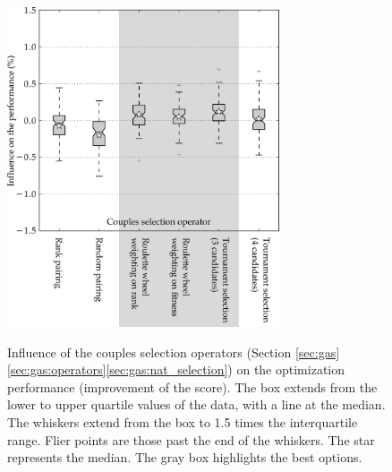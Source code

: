 \documentclass{ametsoc}
\begin{document}
\begin{figure}[t]
	\begin{center}
		\noindent\includegraphics[width=19pc,angle=0]{fig05.pdf}\\
	\end{center}
	\caption{Influence of the couples selection operators (Section \ref{sec:gas}\ref{sec:gas:operators}\ref{sec:gas:nat_selection}) on the optimization performance (improvement of the score). The box extends from the lower to upper quartile values of the data, with a line at the median. The whiskers extend from the box to 1.5 times the interquartile range. Flier points are those past the end of the whiskers. The star represents the median. The gray box highlights the best options.}
	\label{fig:operator_selectcoupl_score}
\end{figure}
\end{document}
